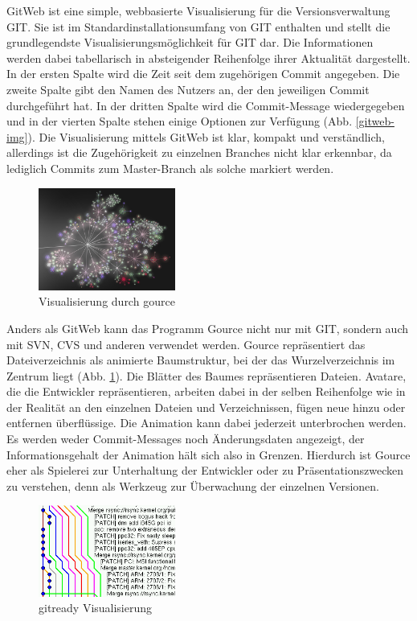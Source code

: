 \documentclass[color, ddc]{tudscrreprt}
\begin{document}
GitWeb ist eine simple, webbasierte Visualisierung für die Versionsverwaltung GIT. Sie ist im Standardinstallationsumfang von GIT enthalten und stellt die grundlegendste Visualisierungsmöglichkeit für GIT dar. Die Informationen werden dabei tabellarisch in absteigender Reihenfolge ihrer Aktualität dargestellt. In der ersten Spalte wird die Zeit seit dem zugehörigen Commit angegeben. Die zweite Spalte gibt den Namen des Nutzers an, der den jeweiligen Commit durchgeführt hat. In der dritten Spalte wird die Commit-Message wiedergegeben und in der vierten Spalte stehen einige Optionen zur Verfügung (Abb. \ref{gitweb-img}). Die Visualisierung mittels GitWeb ist klar, kompakt und verständlich, allerdings ist die Zugehörigkeit zu einzelnen Branches nicht klar erkennbar, da lediglich Commits zum Master-Branch als solche markiert werden.
\begin{figure}[ht!]
\centering
\includegraphics[width=0.4\textwidth]{Skizzen/gource.jpg}
\caption{Visualisierung durch gource}
\label{gource-img}
\end{figure}

	Anders als GitWeb kann das Programm Gource nicht nur mit GIT, sondern auch mit SVN, CVS und anderen verwendet werden. Gource repräsentiert das Dateiverzeichnis als animierte Baumstruktur, bei der das Wurzelverzeichnis im Zentrum liegt (Abb. \ref{gource-img}). Die Blätter des Baumes repräsentieren Dateien. Avatare, die die Entwickler repräsentieren, arbeiten dabei in der selben Reihenfolge wie in der Realität an den einzelnen Dateien und Verzeichnissen, fügen neue hinzu oder entfernen überflüssige. Die Animation kann dabei jederzeit unterbrochen werden. Es werden weder Commit-Messages noch Änderungsdaten angezeigt, der Informationsgehalt der Animation hält sich also in Grenzen. Hierdurch ist Gource eher als Spielerei zur Unterhaltung der Entwickler oder zu Präsentationszwecken zu verstehen, denn als Werkzeug zur Überwachung der einzelnen Versionen.
\begin{figure}[ht!]
\centering
\includegraphics[width=0.4\textwidth]{Skizzen/gitready-gitk.png}
\caption{gitready Visualisierung}
\label{gitready-img}
\end{figure}
\end{document}
